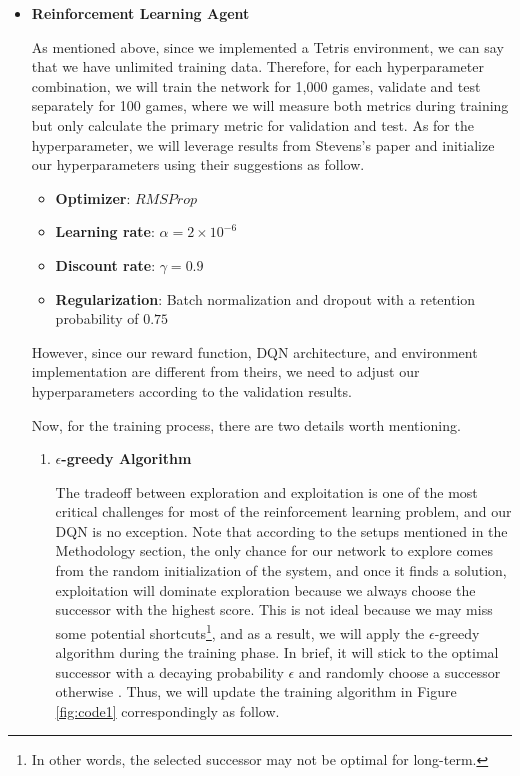 \documentclass[letterpaper]{article} %
\begin{document}
\begin{itemize}
  \item \textbf{Reinforcement Learning Agent} 
  
  As mentioned above, since we implemented a Tetris environment, we can say that we have unlimited training data. Therefore, for each hyperparameter combination, we will train the network for 1,000 games, validate and test separately for 100 games, where we will measure both metrics during training but only calculate the primary metric for validation and test. As for the hyperparameter, we will leverage results from Stevens's paper \cite{Stevens_2016} and initialize our hyperparameters using their suggestions as follow. 
  
  \begin{itemize}
    \item {\bf Optimizer}: $RMSProp$
    \item {\bf Learning rate}: $\alpha = 2\times 10^{-6}$
    \item {\bf Discount rate}: $\gamma = 0.9$
    \item {\bf Regularization}: Batch normalization and dropout with a retention probability of $0.75$
  \end{itemize}

  However, since our reward function, DQN architecture, and environment implementation are different from theirs, we need to adjust our hyperparameters according to the validation results.

  Now, for the training process, there are two details worth mentioning.
  \begin{enumerate}
    \item {\bf $\epsilon$-greedy Algorithm}
    
    The tradeoff between exploration and exploitation is one of the most critical challenges for most of the reinforcement learning problem, and our DQN is no exception. Note that according to the setups mentioned in the Methodology section, the only chance for our network to explore comes from the random initialization of the system, and once it finds a solution, exploitation will dominate exploration because we always choose the successor with the highest score. This is not ideal because we may miss some potential shortcuts\footnote{In other words, the selected successor may not be optimal for long-term.}, and as a result, we will apply the $\epsilon$-greedy algorithm during the training phase. In brief, it will stick to the optimal successor with a decaying probability $\epsilon$ and randomly choose a successor otherwise \cite{Tokic_2010}. Thus, we will update the training algorithm in Figure \ref{fig:code1}  correspondingly as follow.
  

\end{enumerate}
\end{itemize}
\end{document}
